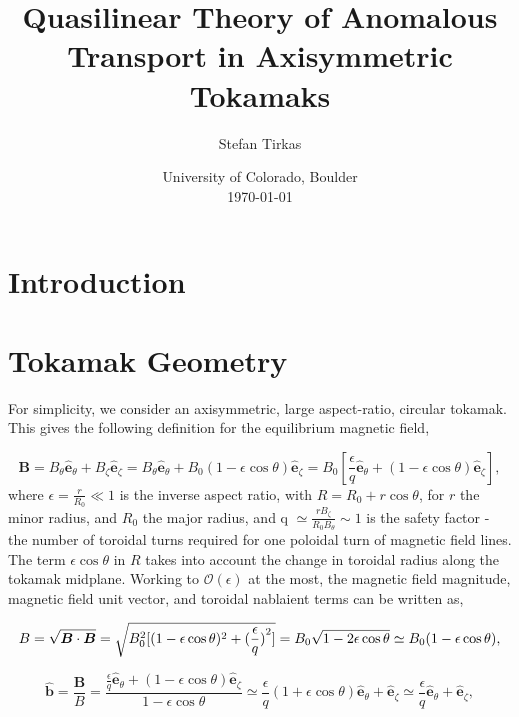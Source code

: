 \documentclass[12pt]{article}
\begin{document}
\title{Quasilinear Theory of Anomalous Transport in Axisymmetric Tokamaks}
\author{Stefan Tirkas}


\date{University of Colorado, Boulder\\[2ex]%
      \today}

\maketitle


\section{Introduction}


\section{Tokamak Geometry}
   \quad For simplicity, we consider an axisymmetric, large aspect-ratio, circular tokamak. This gives
the following definition for the equilibrium magnetic field,

   \begin{equation}
      \bm{B} = B_\theta\bm{\hat{e}}_\theta + B_\zeta\bm{\hat{e}}_\zeta =
               B_\theta\bm{\hat{e}}_\theta + B_0(1-\epsilon\cos\theta)\bm{\hat{e}}_\zeta =
               B_0[\frac{\epsilon}{q}\bm{\hat{e}}_\theta + (1-\epsilon\cos\theta)\bm{\hat{e}}_\zeta],
   \end{equation}
where $\epsilon=\frac{r}{R_0} \ll 1$ is the inverse aspect ratio, with $R=R_0+r\cos\theta$, for $r$ the minor radius,
and $R_0$ the major radius, and q $\simeq\frac{rB_\zeta}{R_0B_\theta}\sim1$ is the safety factor - the number of
toroidal turns required for one poloidal turn of magnetic field lines. The term $\epsilon\cos\theta$ in $R$ takes into
account the change in toroidal radius along the tokamak midplane. Working to $\mathcal{O}(\epsilon)$ at the most, the
magnetic field magnitude, magnetic field unit vector, and toroidal nablaient terms can be written as,
   
   \begin{equation}
      B = \sqrt{\bm{B}\cdot\bm{B}} = \sqrt{B_0^2[(1-\epsilon\cos\theta)^2 + (\frac{\epsilon}{q})\strut^2]} =
          B_0\sqrt{1-2\epsilon\cos\theta} \simeq B_0(1-\epsilon\cos\theta),
   \end{equation}

   \begin{equation}
      \bm{\hat{b}} = \frac{\bm{B}}{B} = \frac{\frac{\epsilon}{q}\bm{\hat{e}}_\theta + (1-\epsilon\cos\theta)\bm{\hat{e}}_\zeta}
                     {1-\epsilon\cos\theta} \simeq \frac{\epsilon}{q}(1+\epsilon\cos\theta)\bm{\hat{e}}_\theta + 
                     \bm{\hat{e}}_\zeta \simeq \frac{\epsilon}{q}\bm{\hat{e}}_\theta + \bm{\hat{e}}_\zeta,
   \end{equation}
\end{document}

